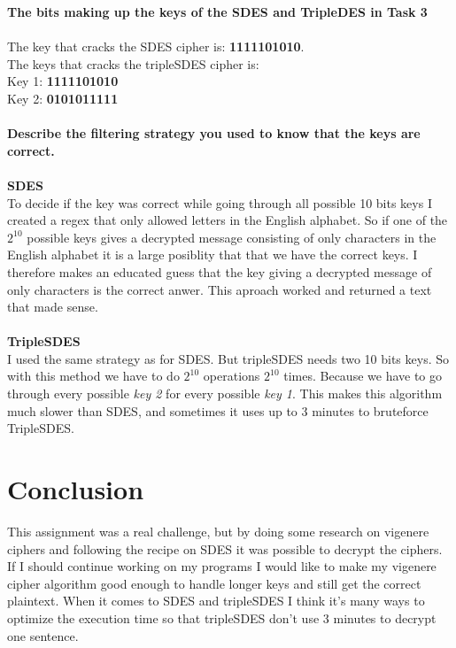 \documentclass[12pt, letterpaper]{article}
\begin{document}
\textbf{The bits making up the keys of the SDES and TripleDES in Task 3}
\\ \\
The key that cracks the SDES cipher is: \textbf{1111101010}. \\
The keys that cracks the tripleSDES cipher is: \\ Key 1: \textbf{1111101010} \\ Key 2: \textbf{0101011111}
\\ \\
\textbf{Describe the filtering strategy you used to know that the keys are correct.}
\\ \\
\textbf{SDES} \\ 
To decide if the key was correct while going through all possible 10 bits keys I created a regex that only allowed letters in the English alphabet. So if one of the $2^{10}$ possible keys gives a decrypted message consisting of only characters in the English alphabet it is a large posiblity that that we have the correct keys. I therefore makes an educated guess that the key giving a decrypted message of only characters is the correct anwer. This aproach worked and returned a text that made sense.
\\ \\
\textbf{TripleSDES} \\
I used the same strategy as for SDES. But tripleSDES needs two 10 bits keys. So with this method we have to do $2^{10}$ operations $2^{10}$ times. Because we have to go through every possible \textit{key 2} for every possible \textit{key 1}. This makes this algorithm much slower than SDES, and sometimes it uses up to 3 minutes to bruteforce TripleSDES.


\section*{Conclusion}
This assignment was a real challenge, but by doing some research on vigenere ciphers and following the recipe on SDES it was possible to decrypt the ciphers. If I should continue working on my programs I would like to make my vigenere cipher algorithm good enough to handle longer keys and still get the correct plaintext. When it comes to SDES and tripleSDES I think it's many ways to optimize the execution time so that tripleSDES don't use 3 minutes to decrypt one sentence. 
\end{document}
